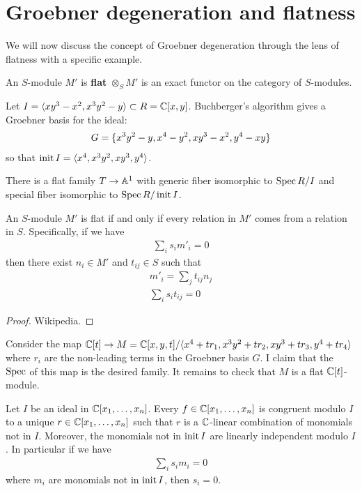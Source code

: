 \documentclass[12pt]{article}
\newcounter{algorithm}
\begin{document}
\section{Groebner degeneration and flatness}
We will now discuss the concept of Groebner degeneration through the lens of flatness with a specific example. 
\begin{definition}
	An $S$-module $M'$ is \textbf{flat} $\otimes_S M'$ is an exact functor on the category of $S$-modules.
\end{definition}

Let $I = \langle{xy^3-x^2,x^3y^2-y}\rangle \subset R = \mathbb{C}[x,y]$. Buchberger's algorithm gives a Groebner basis for the ideal: \begin{align*}
	G = \{x^3y^2-y,x^4-y^2,xy^3-x^2,y^4-xy\}
\end{align*} so that $\operatorname{init} I = \langle{x^4,x^3y^2,xy^3,y^4}\rangle$.

\begin{claim}
	There is a flat family $T \to \mathbb{A}^1$ with generic fiber isomorphic to $\operatorname{Spec} R/I$ and special fiber
	isomorphic to $\operatorname{Spec} R/\operatorname{init} I$.
\end{claim}

\begin{lemma}
	An $S$-module $M'$ is flat if and only if every
	relation in $M'$ comes from a relation in $S$. Specifically, if we have \begin{align*}
		\sum_i s_i m'_i = 0
	\end{align*} then there exist $n_i\in M'$ and $t_{ij}\in S$ such that \begin{align*}
		m'_i = \sum_j t_{ij} n_j \\
		\sum_i s_i t_{ij} = 0
	\end{align*}
\end{lemma}
\begin{proof}
	Wikipedia.
\end{proof}

Consider the map $\mathbb{C}[t] \to M = \mathbb{C}[x,y,t]/\langle{x^4+tr_1,x^3y^2+tr_2,xy^3+tr_3,y^4+tr_4}\rangle$ where
$r_i$ are the non-leading terms in the Groebner basis $G$. I claim that the $\operatorname{Spec}$ of this map
is the desired family. It remains to check that $M$ is a flat $\mathbb{C}[t]$-module.

\begin{theorem}
	Let $I$ be an ideal in $\mathbb{C}[x_1,\ldots,x_n]$. Every $f\in \mathbb{C}[x_1,\ldots,x_n]$ is congruent modulo $I$
	to a unique $r\in \mathbb{C}[x_1,\ldots,x_n]$ such that $r$ is a $\mathbb{C}$-linear combination of monomials not in $I$.
	Moreover, the monomials not in $\operatorname{init} I$ are linearly independent modulo $I$. In particular if we have \begin{align*}
		\sum_i s_i m_i = 0
	\end{align*} where $m_i$ are monomials not in $\operatorname{init} I$, then $s_i = 0$.
\end{theorem}
\end{document}

